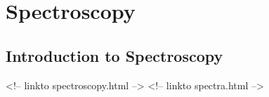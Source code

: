 \chapter{Spectroscopy}

%

\section{Introduction to Spectroscopy}
\begin{rawhtml}
<!-- linkto spectroscopy.html -->
<!-- linkto spectra.html -->
\end{rawhtml}

